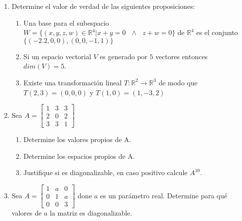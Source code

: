 \documentclass[12pt]{article}
\begin{document}
\begin{enumerate}
      \item Determine el valor de verdad de las siguientes proposiciones:
            \begin{enumerate}
                  \item Una base para el subespacio $W = \{(x,y,z,w) \in \mathbb{R}^4 | x + y = 0 \mbox{ }\land \mbox{ } z+w=0 \}$
                        de $\mathbb{R}^4$ es el conjunto $\{(-2.2,0,0),(0,0,-1,1)\}$
                  \item Si un espacio vectorial $V$ es generado por $5$ vectores entonces $dim(V) = 5$.
                  \item Existe una transformaci\'on lineal $T : \mathbb{R}^2 \rightarrow \mathbb{R}^3$ de modo que
                        $T(2,3)=(0,0,0)$ y $T(1,0) = (1,-3,2)$
            \end{enumerate}
      \item Sea $A = \begin{bmatrix}
                        1 & 3 & 3 \\
                        2 & 0 & 2 \\
                        3 & 3 & 1
                  \end{bmatrix}$
            \begin{enumerate}
                  \item Determine los valores propios de A.
                  \item Determine los espacios propios de A.
                  \item Justifique si es diagonalizable, en caso positivo calcule $A^{10}$.
            \end{enumerate}
      \item Sea $A = \begin{bmatrix}
                        1 & a & 0 \\
                        0 & 1 & a \\
                        0 & 0 & 3
                  \end{bmatrix}$
            done $a$ es un par\'ametro real. Determine para qu\'e valores de $a$ la matriz es diagonalizable.
\end{enumerate}
\end{document}
